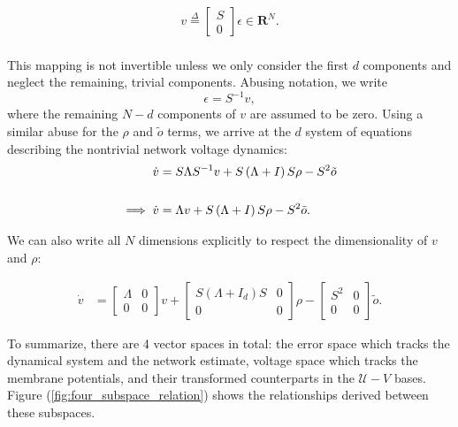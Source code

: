 \begin{enumerate}
\begin{align}
\label{eq:rotated_voltage_def}
v \overset{\Delta}{=} \begin{bmatrix}
S \\ 0
\end{bmatrix} \epsilon \in \mathbf{R}^N.
\end{align}
\\
This mapping is not invertible unless we only consider the first $d$ components and neglect the remaining, trivial components. Abusing notation, we write  
$$
\epsilon = S^{-1} v, 
$$
where the remaining $N-d$ components of $v$ are assumed to be zero. Using a similar abuse for the $\rho$ and $\tilde{o}$ terms, we arrive at the $d$ system of equations describing the nontrivial network voltage dynamics:
\begin{align}
\label{eq:rotated_voltage_dynamics}
\dot{v}
&= 
S\Lambda S^{-1} v + S \left(\Lambda + I \right) S \rho
- S^2 \tilde{o} \notag
\\ \notag
\\
\implies
\dot{v}
&= 
\Lambda v + S \left(\Lambda + I \right) S \rho - S^2 \tilde{o}.
\end{align}

We can also write all $N$ dimensions explicitly to respect the dimensionality of $v$ and $\rho$:

\begin{align*}
\dot{v}
&= 
\begin{bmatrix}
\Lambda & 0
\\
0 & 0
\end{bmatrix}
v +
\begin{bmatrix}
S \left(\Lambda + I_d \right) S & 0
\\
0 & 0
\end{bmatrix}
  \rho - 
 \begin{bmatrix}
S^2 & 0
\\
0 & 0
\end{bmatrix}
    \tilde{o}.
\end{align*}

To summarize, there are 4 vector spaces in total: the error space which tracks the dynamical system and the network estimate, voltage space which tracks the membrane potentials, and their transformed counterparts in the $\mathcal{U}-V$ bases. Figure (\ref{fig:four_subspace_relation}) shows the relationships derived between these subspaces.


\end{enumerate}
